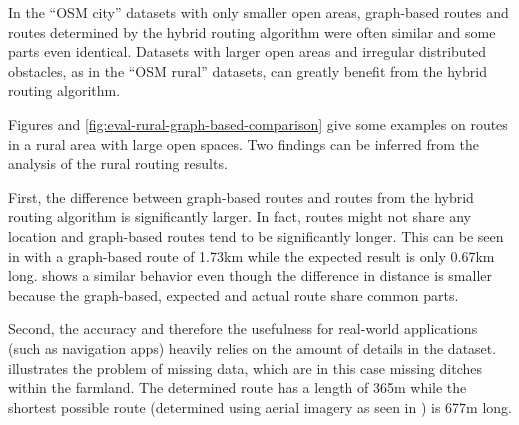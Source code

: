 			In the \enquote{OSM city} datasets with only smaller open areas, graph-based routes and routes determined by the hybrid routing algorithm were often similar and some parts even identical.
			Datasets with larger open areas and irregular distributed obstacles, as in the \enquote{OSM rural} datasets, can greatly benefit from the hybrid routing algorithm.
			
			Figures  and \ref{fig:eval-rural-graph-based-comparison} give some examples on routes in a rural area with large open spaces.
			Two findings can be inferred from the analysis of the rural routing results.
			
			First, the difference between graph-based routes and routes from the hybrid routing algorithm is significantly larger.
			In fact, routes might not share any location and graph-based routes tend to be significantly longer.
			This can be seen in  with a graph-based route of 1.73km while the expected result is only 0.67km long.
			 shows a similar behavior even though the difference in distance is smaller because the graph-based, expected and actual route share common parts.
			
			Second, the accuracy and therefore the usefulness for real-world applications (such as navigation apps) heavily relies on the amount of details in the dataset.
			 illustrates the problem of missing data, which are in this case missing ditches within the farmland.
			The determined route has a length of 365m while the shortest possible route (determined using aerial imagery as seen in ) is 677m long.
			
